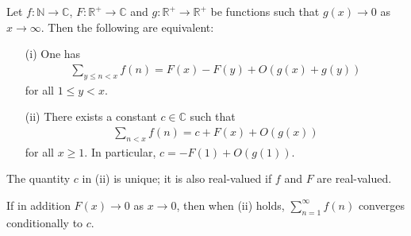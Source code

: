 \documentclass[11pt]{article}
\newenvironment{ex}[1]
  {\renewcommand\theinnercustomthm{#1}\innercustomthm}
  {\endinnercustomthm}
\begin{document}
\begin{ex}{6}\label{six}
Let $f:\mathbb{N}\to\mathbb{C}$, $F:\mathbb{R}^+\to\mathbb{C}$ and $g:\mathbb{R}^+\to\mathbb{R}^+$ be functions such that $g(x)\to 0$ as $x\to\infty$. Then the following are equivalent:
\begin{enumerate}
\item[(i)]One has
\begin{align*}
\sum_{y\leq n<x} f(n) = F(x)-F(y)+O(g(x)+g(y))
\end{align*}
for all $1\leq y<x$.
\item[(ii)] There exists a constant $c\in\mathbb{C}$ such that
\begin{align*}
\sum_{n<x}f(n) = c+F(x)+O(g(x))
\end{align*}
for all $x\geq 1$. In particular, $c=-F(1)+O(g(1))$.
\end{enumerate}
The quantity $c$ in (ii) is unique; it is also real-valued if $f$ and $F$ are real-valued.

If in addition $F(x)\to 0$ as $x\to 0$, then when (ii) holds, $\sum_{n=1}^\infty f(n)$ converges conditionally to $c$.
\end{ex}
\end{document}
